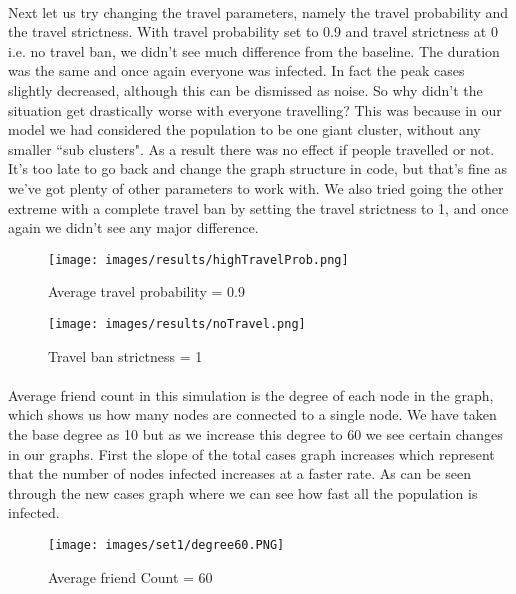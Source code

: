 \documentclass[12pt, a4paper]{extarticle}
\begin{document}
    \newpage
    \paragraph{} Next let us try changing the travel parameters, namely the travel probability and the travel strictness. With travel probability set to 0.9 and travel strictness at 0 i.e. no travel ban, we didn't see much difference from the baseline. The duration was the same and once again everyone was infected. In fact the peak cases slightly decreased, although this can be dismissed as noise. So why didn't the situation get drastically worse with everyone travelling? This was because in our model we had considered the population to be one giant cluster, without any smaller ``sub clusters". As a result there was no effect if people travelled or not. It's too late to go back and change the graph structure in code, but that's fine as we've got plenty of other parameters to work with. We also tried going the other extreme with a complete travel ban by setting the travel strictness to 1, and once again we didn't see any major difference.
    \begin{figure}[h]
        \centering
        \texttt{[image: images/results/highTravelProb.png]}
        \caption{Average travel probability = 0.9}
    \end{figure}
    \newpage
    \begin{figure}[h]
        \centering
        \texttt{[image: images/results/noTravel.png]}
        \caption{Travel ban strictness = 1}
    \end{figure}
    
    
    \newpage
    \paragraph{}
    Average friend count in this simulation is the degree of each node in the graph, which shows us how many nodes are connected to a single node.
    We have taken the base degree as 10 but as we increase this degree to 60 we see certain changes in our graphs.
    First the slope of the total cases graph increases which represent that the number of nodes infected increases at a faster rate. As can be seen through the new cases graph where we can see how fast all the population is infected.
    \vspace{0.2in}
    \begin{figure}[h]
        \centering
        \texttt{[image: images/set1/degree60.PNG]}
        \caption{Average friend Count = 60}
    \end{figure}
    
\end{document}
